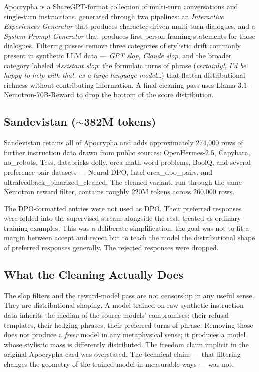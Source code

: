 \documentclass[11pt,letterpaper]{article}
\begin{document}
Apocrypha is a ShareGPT-format collection of multi-turn conversations and single-turn instructions, generated through two pipelines: an \textit{Interactive Experiences Generator} that produces character-driven multi-turn dialogues, and a \textit{System Prompt Generator} that produces first-person framing statements for those dialogues. Filtering passes remove three categories of stylistic drift commonly present in synthetic LLM data --- \textit{GPT slop}, \textit{Claude slop}, and the broader category labeled \textit{Assistant slop}: the formulaic turns of phrase (\textit{certainly!}, \textit{I'd be happy to help with that}, \textit{as a large language model\dots}) that flatten distributional richness without contributing information. A final cleaning pass uses Llama-3.1-Nemotron-70B-Reward to drop the bottom of the score distribution.

\subsection{Sandevistan ($\sim$382M tokens)}

Sandevistan retains all of Apocrypha and adds approximately 274,000 rows of further instruction data drawn from public sources: OpenHermes-2.5, Capybara, no\_robots, Tess, databricks-dolly, orca-math-word-problems, BoolQ, and several preference-pair datasets --- Neural-DPO, Intel orca\_dpo\_pairs, and ultrafeedback\_binarized\_cleaned. The cleaned variant, run through the same Nemotron reward filter, contains roughly 220M tokens across 260,000 rows.

The DPO-formatted entries were not used as DPO. Their preferred responses were folded into the supervised stream alongside the rest, treated as ordinary training examples. This was a deliberate simplification: the goal was not to fit a margin between accept and reject but to teach the model the distributional shape of preferred responses generally. The rejected responses were dropped.

\subsection{What the Cleaning Actually Does}

The slop filters and the reward-model pass are not censorship in any useful sense. They are distributional shaping. A model trained on raw synthetic instruction data inherits the median of the source models' compromises: their refusal templates, their hedging phrases, their preferred turns of phrase. Removing those does not produce a \textit{freer} model in any metaphysical sense; it produces a model whose stylistic mass is differently distributed. The freedom claim implicit in the original Apocrypha card was overstated. The technical claim --- that filtering changes the geometry of the trained model in measurable ways --- was not.
\end{document}
